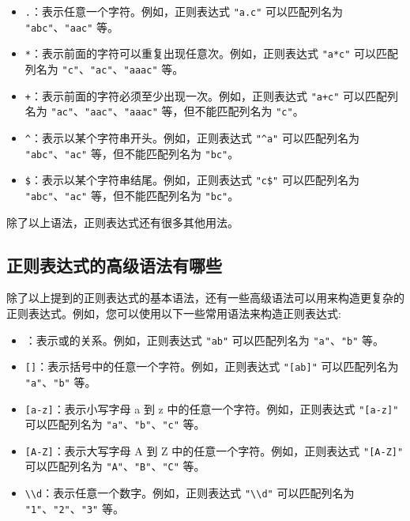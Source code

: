 \documentclass[
  letterpaper,
  DIV=11,
  numbers=noendperiod]{scrreprt}
\providecommand{\tightlist}{%
  \setlength{\itemsep}{0pt}\setlength{\parskip}{0pt}}\usepackage{longtable,booktabs,array}
\begin{document}
\begin{itemize}
\item
  \texttt{.}：表示任意一个字符。例如，正则表达式 \texttt{"a.c"}
  可以匹配列名为 \texttt{"abc"}、\texttt{"aac"} 等。
\item
  \texttt{*}：表示前面的字符可以重复出现任意次。例如，正则表达式
  \texttt{"a*c"} 可以匹配列名为
  \texttt{"c"}、\texttt{"ac"}、\texttt{"aaac"} 等。
\item
  \texttt{+}：表示前面的字符必须至少出现一次。例如，正则表达式
  \texttt{"a+c"} 可以匹配列名为
  \texttt{"ac"}、\texttt{"aac"}、\texttt{"aaac"} 等，但不能匹配列名为
  \texttt{"c"}。
\item
  \texttt{\^{}}：表示以某个字符串开头。例如，正则表达式 \texttt{"\^{}a"}
  可以匹配列名为 \texttt{"abc"}、\texttt{"ac"} 等，但不能匹配列名为
  \texttt{"bc"}。
\item
  \texttt{\$}：表示以某个字符串结尾。例如，正则表达式 \texttt{"c\$"}
  可以匹配列名为 \texttt{"abc"}、\texttt{"ac"} 等，但不能匹配列名为
  \texttt{"bc"}。
\end{itemize}

除了以上语法，正则表达式还有很多其他用法。

\hypertarget{ux6b63ux5219ux8868ux8fbeux5f0fux7684ux9ad8ux7ea7ux8bedux6cd5ux6709ux54eaux4e9b}{%
\subsection{正则表达式的高级语法有哪些}\label{ux6b63ux5219ux8868ux8fbeux5f0fux7684ux9ad8ux7ea7ux8bedux6cd5ux6709ux54eaux4e9b}}

除了以上提到的正则表达式的基本语法，还有一些高级语法可以用来构造更复杂的正则表达式。例如，您可以使用以下一些常用语法来构造正则表达式:

\begin{itemize}
\tightlist
\item
  \texttt{\textbar{}}：表示或的关系。例如，正则表达式
  \texttt{"a\textbar{}b"} 可以匹配列名为 \texttt{"a"}、\texttt{"b"} 等。
\item
  \texttt{{[}{]}}：表示括号中的任意一个字符。例如，正则表达式
  \texttt{"{[}ab{]}"} 可以匹配列名为 \texttt{"a"}、\texttt{"b"} 等。
\item
  \texttt{{[}a-z{]}}：表示小写字母 a 到 z
  中的任意一个字符。例如，正则表达式 \texttt{"{[}a-z{]}"} 可以匹配列名为
  \texttt{"a"}、\texttt{"b"}、\texttt{"c"} 等。
\item
  \texttt{{[}A-Z{]}}：表示大写字母 A 到 Z
  中的任意一个字符。例如，正则表达式 \texttt{"{[}A-Z{]}"} 可以匹配列名为
  \texttt{"A"}、\texttt{"B"}、\texttt{"C"} 等。
\item
  \texttt{\textbackslash{}\textbackslash{}d}：表示任意一个数字。例如，正则表达式
  \texttt{"\textbackslash{}\textbackslash{}d"} 可以匹配列名为
  \texttt{"1"}、\texttt{"2"}、\texttt{"3"} 等。
\end{itemize}
\end{document}
